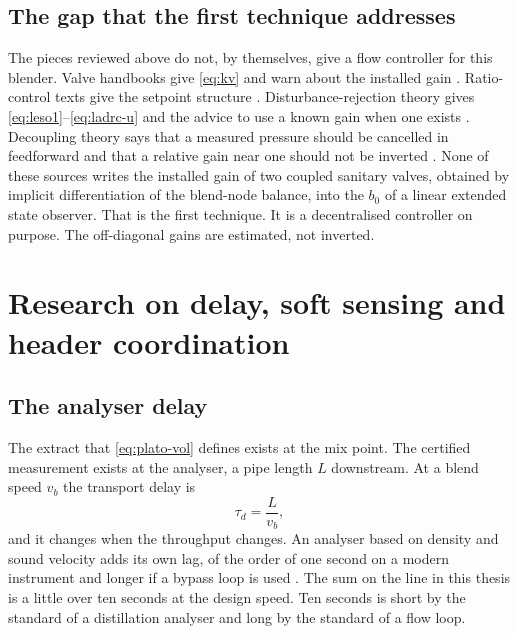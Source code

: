 \subsection{The gap that the first technique addresses}

The pieces reviewed above do not, by themselves, give a flow controller for this blender. Valve handbooks give \eqref{eq:kv} and warn about the installed gain \cite{fisher2005valve,iec60534}. Ratio-control texts give the setpoint structure \cite{shinskey1996process,liptak2006handbook}. Disturbance-rejection theory gives \eqref{eq:leso1}--\eqref{eq:ladrc-u} and the advice to use a known gain when one exists \cite{fu2016tuning,gao2003scaling}. Decoupling theory says that a measured pressure should be cancelled in feedforward and that a relative gain near one should not be inverted \cite{zheng2009decoupling,bristol1966rga}. None of these sources writes the installed gain of two coupled sanitary valves, obtained by implicit differentiation of the blend-node balance, into the $b_0$ of a linear extended state observer. That is the first technique. It is a decentralised controller on purpose. The off-diagonal gains are estimated, not inverted.

\section{Research on delay, soft sensing and header coordination}
\label{sec:lit-tech2}

\subsection{The analyser delay}

The extract that \eqref{eq:plato-vol} defines exists at the mix point. The certified measurement exists at the analyser, a pipe length $L$ downstream. At a blend speed $v_b$ the transport delay is
\begin{equation}
\label{eq:delay}
\tau_d = \frac{L}{v_b},
\end{equation}
and it changes when the throughput changes. An analyser based on density and sound velocity adds its own lag, of the order of one second on a modern instrument and longer if a bypass loop is used \cite{baker2016flow,mebak2013wort}. The sum on the line in this thesis is a little over ten seconds at the design speed. Ten seconds is short by the standard of a distillation analyser and long by the standard of a flow loop.

